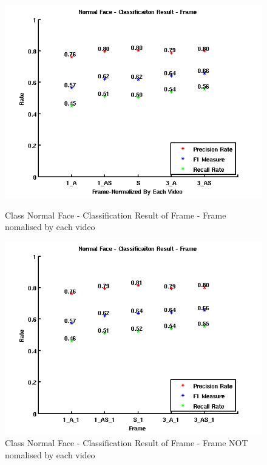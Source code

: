 \begin{figure}[ht]
\centering
\begin{minipage}{.5\textwidth}
  \centering
  \captionsetup{justification=centering,margin=1cm}
  \includegraphics[width=\linewidth]{imgs/Result_NormalFace_Frame.png}
  \caption{Class Normal Face - Classification Result of Frame - Frame nomalised by each video}
  \label{fig:RNF}
\end{minipage}%
\begin{minipage}{.5\textwidth}
  \centering
  \captionsetup{justification=centering,margin=1cm}
  \includegraphics[width=\linewidth]{imgs/Result_NormalFace_Frame_1.png}
  \caption{Class Normal Face - Classification Result of Frame - Frame NOT nomalised by each video}
  \label{fig:RNF1}
\end{minipage}
\end{figure}

